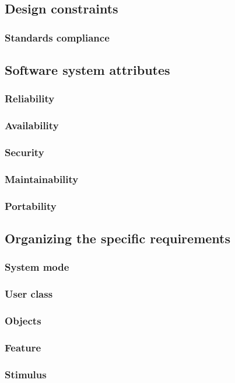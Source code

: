 \documentclass[draftclsnofoot,onecolumn,letterpaper,10pt,compsoc]{IEEEtran}
\begin{document}
	\subsection{Design constraints}
		\subsubsection{Standards compliance}
	\subsection{Software system attributes}
		\subsubsection{Reliability}
		\subsubsection{Availability}
		\subsubsection{Security}
		\subsubsection{Maintainability}
		\subsubsection{Portability}
	\subsection{Organizing the specific requirements}
		\subsubsection{System mode}
		\subsubsection{User class}
		\subsubsection{Objects}
		\subsubsection{Feature}
		\subsubsection{Stimulus}
\end{document}
